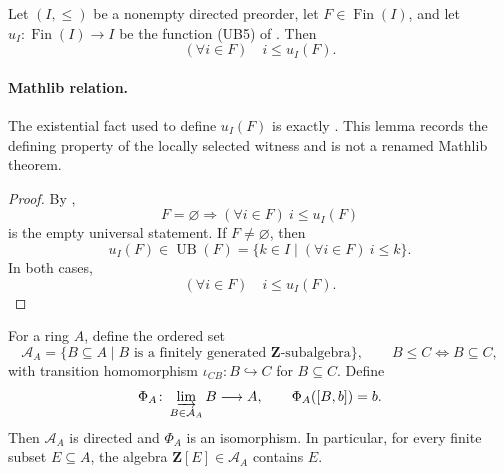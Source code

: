 \begin{lemma}
  \label{lemma:nagata-directed-finite-upper-bound}

  Let \((I,\leq)\) be a nonempty directed preorder, let
  \(F\in\operatorname{Fin}(I)\), and let
  \(u_I\colon\operatorname{Fin}(I)\to I\) be the function (UB5) of
  .  Then
  \[
    (\forall i\in F)\quad i\leq u_I(F).
  \]

  \paragraph{Mathlib relation.}
  The existential fact used to define $u_I(F)$ is exactly
  \texttt{}.  This lemma records the defining
  property of the locally selected witness and is not a renamed Mathlib
  theorem.
\end{lemma}

\begin{proof}
  By ,
  \[
    F=\varnothing\Longrightarrow
      (\forall i\in F)\ i\leq u_I(F)
  \]
  is the empty universal statement.  If $F\neq\varnothing$, then
  \[
    u_I(F)\in\operatorname{UB}(F)
      =\{k\in I\mid(\forall i\in F)\ i\leq k\}.
  \]
  In both cases,
  \[
    (\forall i\in F)\quad i\leq u_I(F).
  \]
\end{proof}

\begin{lemma}
  \label{lemma:nagata-ring-finite-type-subalgebras}

  For a ring $A$, define the ordered set
  \[
    \mathcal A_A
      =\{B\subseteq A\mid B\text{ is a finitely generated }
        \mathbf Z\text{-subalgebra}\},
    \qquad
    B\leq C\Longleftrightarrow B\subseteq C,
  \]
  with transition homomorphism
  $\iota_{CB}\colon B\hookrightarrow C$ for $B\subseteq C$.  Define
  \[
    \Phi_A\colon\varinjlim_{B\in\mathcal A_A}B\longrightarrow A,
    \qquad
    \Phi_A([B,b])=b.
  \]
  Then $\mathcal A_A$ is directed and $\Phi_A$ is an isomorphism.  In
  particular, for every finite subset $E\subseteq A$, the algebra
  $\mathbf Z[E]\in\mathcal A_A$ contains $E$.
\end{lemma}

